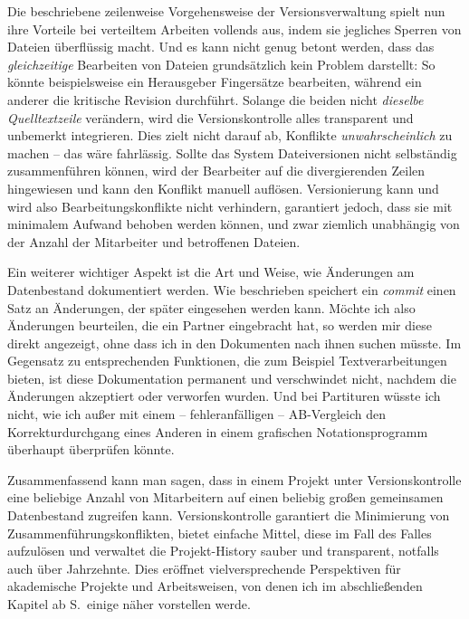 \documentclass[DIV=12]{scrreprt}
\begin{document}
Die beschriebene zeilenweise Vorgehensweise der Versionsverwaltung spielt nun ihre Vorteile bei verteiltem Arbeiten vollends aus, indem sie jegliches Sperren von Dateien überflüssig macht.
Und es kann nicht genug betont werden, dass das \emph{gleichzeitige} Bearbeiten von Dateien grundsätzlich kein Problem darstellt:
So könnte beispielsweise ein Herausgeber Fingersätze bearbeiten, während ein anderer die kritische Revision durchführt.
Solange die beiden nicht \emph{dieselbe Quelltextzeile} verändern, wird die Versionskontrolle alles transparent und unbemerkt integrieren.
Dies zielt nicht darauf ab, Konflikte \emph{unwahrscheinlich} zu machen -- das wäre fahrlässig.
Sollte das System Dateiversionen nicht selbständig zusammenführen können, wird der Bearbeiter auf die divergierenden Zeilen hingewiesen und kann den Konflikt manuell auflösen.
Versionierung kann und wird also Bearbeitungskonflikte nicht verhindern, garantiert jedoch, dass sie mit minimalem Aufwand behoben werden können, und zwar ziemlich unabhängig von der Anzahl der Mitarbeiter und betroffenen Dateien.

\medskip
Ein weiterer wichtiger Aspekt ist die Art und Weise, wie Änderungen am Datenbestand dokumentiert werden.
Wie beschrieben speichert ein \emph{commit} einen Satz an Änderungen, der später eingesehen werden kann.
Möchte ich also Änderungen beurteilen, die ein Partner eingebracht hat, so werden mir diese direkt angezeigt, ohne dass ich in den Dokumenten nach ihnen suchen müsste.
Im Gegensatz zu entsprechenden Funktionen, die zum Beispiel Textverarbeitungen bieten, ist diese Dokumentation permanent und verschwindet nicht, nachdem die Änderungen akzeptiert oder verworfen wurden.
Und bei Partituren wüsste ich nicht, wie ich außer mit einem -- fehleranfälligen -- AB-Vergleich den Korrekturdurchgang eines Anderen in einem grafischen Notationsprogramm überhaupt überprüfen könnte.


\medskip
Zusammenfassend kann man sagen, dass in einem Projekt unter Versionskontrolle eine beliebige Anzahl von Mitarbeitern auf einen beliebig großen gemeinsamen Datenbestand zugreifen kann.
Versionskontrolle garantiert die Minimierung von Zusammenführungskonflikten, bietet einfache Mittel, diese im Fall des Falles aufzulösen und verwaltet die Projekt-History sauber und transparent, notfalls auch über Jahrzehnte.
Dies eröffnet vielversprechende Perspektiven für akademische Projekte und Arbeitsweisen, von denen ich im abschließenden Kapitel ab S.\,\pageref{chap:pt_applications} einige näher vorstellen werde.
\end{document}

